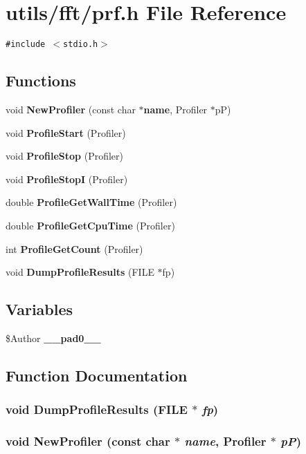 \section{utils/fft/prf.h File Reference}
\label{prf_8h}
{\tt \#include $<$stdio.h$>$}\par
\subsection*{Functions}
\begin{CompactItemize}
\item 
void {\bf New\-Profiler} (const char $\ast${\bf name}, Profiler $\ast$p\-P)
\item 
void {\bf Profile\-Start} (Profiler)
\item 
void {\bf Profile\-Stop} (Profiler)
\item 
void {\bf Profile\-Stop\-I} (Profiler)
\item 
double {\bf Profile\-Get\-Wall\-Time} (Profiler)
\item 
double {\bf Profile\-Get\-Cpu\-Time} (Profiler)
\item 
int {\bf Profile\-Get\-Count} (Profiler)
\item 
void {\bf Dump\-Profile\-Results} (FILE $\ast$fp)
\end{CompactItemize}
\subsection*{Variables}
\begin{CompactItemize}
\item 
\$Author {\bf \_\-\_\-pad0\_\-\_\-}
\end{CompactItemize}


\subsection{Function Documentation}
\subsubsection{\setlength{\rightskip}{0pt plus 5cm}void Dump\-Profile\-Results (FILE $\ast$ {\em fp})}\label{prf_8h_c2c80796c939e13fe915eae93bbc91e8}


\subsubsection{\setlength{\rightskip}{0pt plus 5cm}void New\-Profiler (const char $\ast$ {\em name}, Profiler $\ast$ {\em p\-P})}\label{prf_8h_00f679998c8b8a0dd0cfb902b620e8a2}


